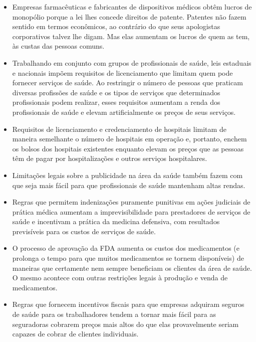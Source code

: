 \begin{itemize}
\item Empresas farmacêuticas e fabricantes de dispositivos médicos obtêm lucros de monopólio porque a lei lhes concede direitos de patente. Patentes não fazem sentido em termos econômicos, ao contrário do que seus apologistas corporativos talvez lhe digam. Mas elas aumentam os lucros de quem as tem, às custas das pessoas comuns.

\item Trabalhando em conjunto com grupos de profissionais de saúde, leis estaduais e nacionais impõem requisitos de licenciamento que limitam quem pode fornecer serviços de saúde. Ao restringir o número de pessoas que praticam diversas profissões de saúde e os tipos de serviços que determinados profissionais podem realizar, esses requisitos aumentam a renda dos profissionais de saúde e elevam artificialmente os preços de seus serviços.

\item Requisitos de licenciamento e credenciamento de hospitais limitam de maneira semelhante o número de hospitais em operação e, portanto, enchem os bolsos dos hospitais existentes enquanto elevam os preços que as pessoas têm de pagar por hospitalizações e outros serviços hospitalares.

\item Limitações legais sobre a publicidade na área da saúde também fazem com que seja mais fácil para que profissionais de saúde mantenham altas rendas.

\item Regras que permitem indenizações puramente punitivas em ações judiciais de prática médica aumentam a imprevisibilidade para prestadores de serviços de saúde e incentivam a prática da medicina defensiva, com resultados previsíveis para os custos de serviços de saúde.

\item O processo de aprovação da FDA aumenta os custos dos medicamentos (e prolonga o tempo para que muitos medicamentos se tornem disponíveis) de maneiras que certamente nem sempre beneficiam os clientes da área de saúde. O mesmo acontece com outras restrições legais à produção e venda de medicamentos.

\item Regras que fornecem incentivos fiscais para que empresas adquiram seguros de saúde para os trabalhadores tendem a tornar mais fácil para as seguradoras cobrarem preços mais altos do que elas provavelmente seriam capazes de cobrar de clientes individuais.


\end{itemize}
